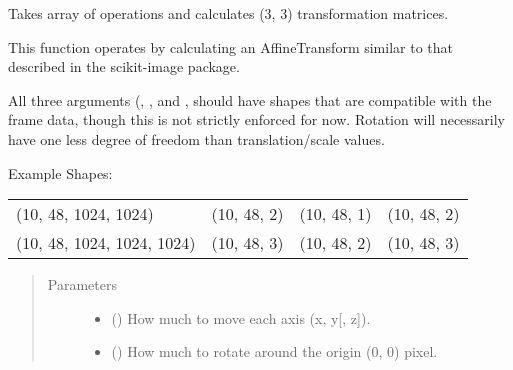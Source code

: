\documentclass[letterpaper,10pt,english]{sphinxmanual}
\begin{document}

\begin{fulllineitems}
\label{\detokenize{xanespy:xanespy.xanes_math.transformation_matrices}}
Takes array of operations and calculates (3, 3) transformation
matrices.

This function operates by calculating an AffineTransform similar
to that described in the scikit-image package.

All three arguments (, , and ,
should have shapes that are compatible with the frame data, though
this is not strictly enforced for now. Rotation will necessarily
have one less degree of freedom than translation/scale values.

Example Shapes:


\begin{savenotes}\sphinxattablestart
\centering
\begin{tabulary}{\linewidth}[t]{|T|T|T|T|}
\hline
{}\relax &\relax &\relax &\relax \\
\hline
(10, 48, 1024, 1024)
&
(10, 48, 2)
&
(10, 48, 1)
&
(10, 48, 2)
\\
\hline
(10, 48, 1024, 1024, 1024)
&
(10, 48, 3)
&
(10, 48, 2)
&
(10, 48, 3)
\\
\hline
\end{tabulary}
\par
\sphinxattableend\end{savenotes}
\begin{quote}\begin{description}
\item[{Parameters}] \leavevmode\begin{itemize}
\item {} 
 (\sphinxstyleliteralemphasis{, }) \textendash{} How much to move each axis (x, y{[}, z{]}).

\item {} 
 (\sphinxstyleliteralemphasis{, }) \textendash{} How much to rotate around the origin (0, 0) pixel.


\end{itemize}
\end{description}
\end{quote}
\end{fulllineitems}
\end{document}
